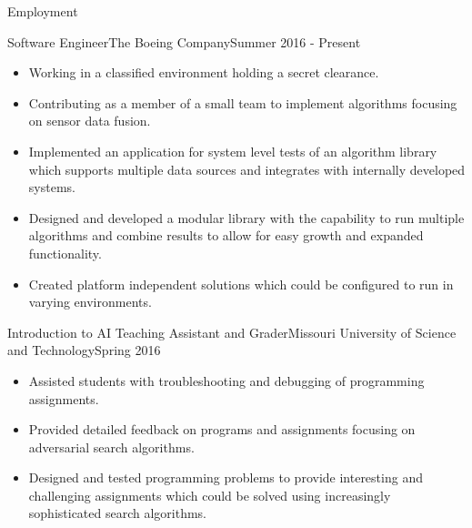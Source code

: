 \documentclass[]{mcdowellcv}
\begin{document}
\makeheader

\begin{cvsection}{Employment}

\begin{boeing}
    \begin{cvsubsection}{Software Engineer}{The Boeing Company}{Summer 2016 - Present}         
        \begin{itemize}
            \item Working in a classified environment holding a secret clearance.
            \item Contributing as a member of a small team to implement algorithms focusing on sensor data fusion.
            \item Implemented an application for system level tests of an algorithm library which supports multiple data sources and integrates with internally developed systems. 
            \item Designed and developed a modular library with the capability to run multiple algorithms and combine results to allow for easy growth and expanded functionality.
            \item Created platform independent solutions which could be configured to run in varying environments.
        \end{itemize}
    \end{cvsubsection}
\end{boeing}
    
\begin{aigrader}
    \begin{cvsubsection}[2]{Introduction to AI Teaching Assistant and Grader}{Missouri University of Science and Technology}{Spring 2016}
        \begin{itemize}
            \item Assisted students with troubleshooting and debugging of programming assignments.
            \item Provided detailed feedback on programs and assignments focusing on adversarial search algorithms.
            \item Designed and tested programming problems to provide interesting and challenging assignments which could be solved using increasingly sophisticated search algorithms.
        \end{itemize}
    \end{cvsubsection}
\end{aigrader}


\end{cvsection}
\end{document}

